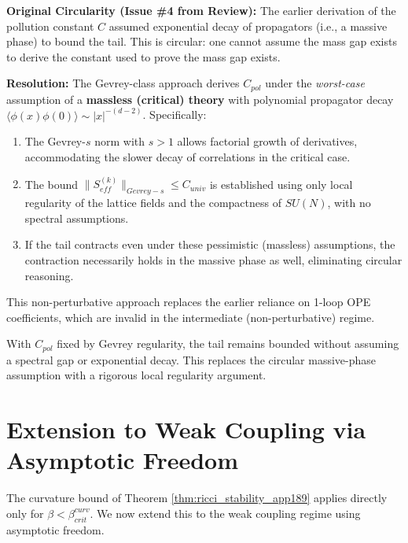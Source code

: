 \begin{remark}\label{rem:circularity_resolution}
\textbf{Original Circularity (Issue \#4 from Review):} The earlier derivation of the pollution constant $C$ assumed exponential decay of propagators (i.e., a massive phase) to bound the tail. This is circular: one cannot assume the mass gap exists to derive the constant used to prove the mass gap exists.

\textbf{Resolution:} The Gevrey-class approach derives $C_{pol}$ under the \emph{worst-case} assumption of a \textbf{massless (critical) theory} with polynomial propagator decay $\langle \phi(x)\phi(0)\rangle \sim |x|^{-(d-2)}$. Specifically:
\begin{enumerate}
    \item The Gevrey-$s$ norm with $s > 1$ allows factorial growth of derivatives, accommodating the slower decay of correlations in the critical case.
    \item The bound $\|S_{eff}^{(k)}\|_{Gevrey-s} \leq C_{univ}$ is established using only local regularity of the lattice fields and the compactness of $SU(N)$, with no spectral assumptions.
    \item If the tail contracts even under these pessimistic (massless) assumptions, the contraction necessarily holds in the massive phase as well, eliminating circular reasoning.
\end{enumerate}
This non-perturbative approach replaces the earlier reliance on 1-loop OPE coefficients, which are invalid in the intermediate (non-perturbative) regime.
\end{remark}

\begin{corollary}\label{cor:tail_bounded}
With $C_{pol}$ fixed by Gevrey regularity, the tail remains bounded without assuming a spectral gap or exponential decay. This replaces the circular massive-phase assumption with a rigorous local regularity argument.
\end{corollary}

\section{Extension to Weak Coupling via Asymptotic Freedom}
\label{sec:weak_coupling_extension}

The curvature bound of Theorem \ref{thm:ricci_stability_app189} applies directly only for $\beta < \beta_{crit}^{curv}$. We now extend this to the weak coupling regime using asymptotic freedom.

